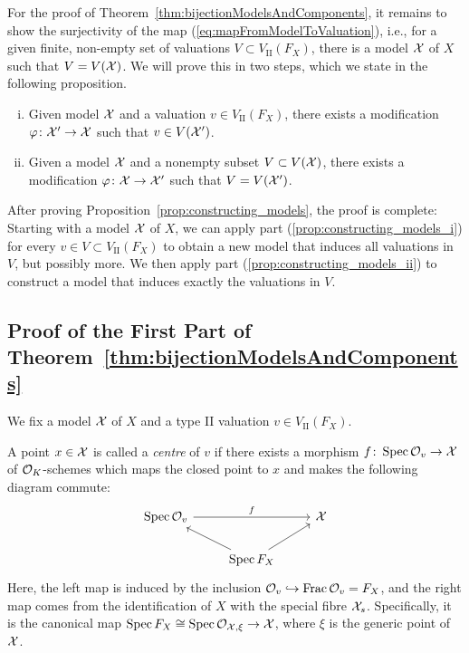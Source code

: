 For the proof of Theorem~\ref{thm:bijectionModelsAndComponents}, it remains to show the surjectivity of the map (\eqref{eq:mapFromModelToValuation}),
i.e., for a given finite, non-empty set of valuations
$V \subset V_\textrm{II}(F_X)$, there is a model $\mathcal X$ of $X$ such that $V = V(\mathcal X)$.
We will prove this in two steps, which we state in the following proposition.

\begin{proposition} \label{prop:constructing_models}
    \begin{enumerate}[(i)]
        \item Given model $\mathcal X$ and a valuation $v \in V_\textrm{II}(F_X)$, there exists a modification
        $\varphi \colon \mathcal X' \to \mathcal X$ such that $v \in V(\mathcal X')$. \label{prop:constructing_models_i}
        \item Given a model $\mathcal X$ and a nonempty subset $V \subset V(\mathcal X)$,
        there exists a modification $\varphi \colon \mathcal X \to \mathcal X'$ such that $V = V(\mathcal X')$. \label{prop:constructing_models_ii}
    \end{enumerate}
\end{proposition}

After proving Proposition~\ref{prop:constructing_models}, the proof is complete:
Starting with a model $\mathcal X$ of $X$, we can apply part (\ref{prop:constructing_models_i}) for every $v \in V \subset V_\textrm{II}(F_X)$
to obtain a new model that induces all valuations in $V$, but possibly more.
We then apply part (\ref{prop:constructing_models_ii}) to construct a model that induces exactly the valuations in $V$.


\subsection{Proof of the First Part of Theorem~\ref{thm:bijectionModelsAndComponents}}\label{subsec:proof-of-the-first-part}

We fix a model $\mathcal X$ of $X$ and a type II valuation $v \in V_\textrm{II}(F_X)$.

\begin{definition}
    A point $x \in \mathcal X$ is called a \textit{centre} of $v$ if there exists a morphism $f \colon \operatorname{Spec} \mathcal{O}_v  \to \mathcal X$ of $\mathcal O_K $-schemes
    which maps the closed point to $x$ and makes the following diagram commute:
    \[
        \begin{tikzcd}
            \Spec \OO_v \arrow[rr, "f"] &                                 & \X \\
            & \Spec F_X \arrow[ru] \arrow[lu] &
        \end{tikzcd}
    \]
    Here, the left map is induced by the inclusion $\mathcal{O}_v \hookrightarrow \operatorname{Frac} \mathcal{O}_v = F_X$,
    and the right map comes from the identification of $X$ with the special fibre $\mathcal X_s$.
    Specifically, it is the canonical map $\operatorname{Spec} F_X \cong \operatorname{Spec} \mathcal{O}_{\mathcal X, \xi} \to \mathcal X$, where $\xi$ is the generic point of $\mathcal X$.
\end{definition}


